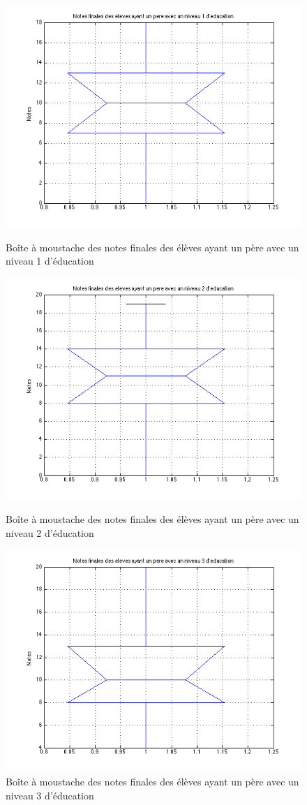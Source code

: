 \documentclass[11pt]{article}
\begin{document}
\begin{figure}[h]
\centering
\includegraphics[scale=0.45]{Images/fig35.png}
\caption{Boîte à moustache des notes finales des élèves ayant un père avec un niveau 1 d'éducation}
\includegraphics[scale=0.45]{Images/fig36.png}
\caption{Boîte à moustache des notes finales des élèves ayant un père avec un niveau 2 d'éducation}
\includegraphics[scale=0.45]{Images/fig37.png}
\caption{Boîte à moustache des notes finales des élèves ayant un père avec un niveau 3 d'éducation}
\end{figure}
\end{document}

